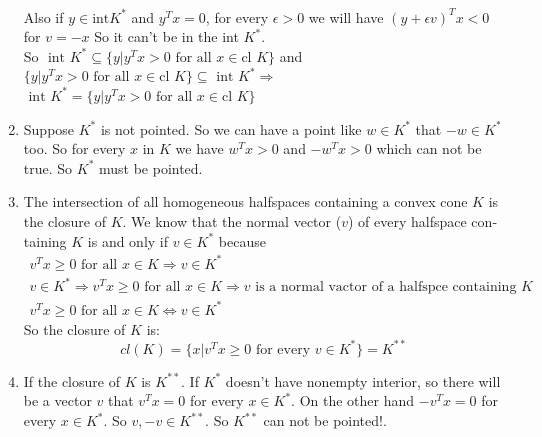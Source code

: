 \documentclass[a4paper]{article}
\begin{document}
\begin{latin}
\begin{enumerate}
	\\
	Also if $ y \in \text{int} K^{*} $ and $ y^{T}x = 0 $, for every $ \epsilon >0 $
	we will have $ (y+\epsilon v)^{T}x < 0 $ for $ v = -x $ So it can't be in the int $ K^{*} $. 
	\\
	So $ \text{ int } K^{*} \subseteq \{y | y^{T} x > 0 \text{ for all } x \in \text{cl } K \}$ and $ \{y | y^{T} x > 0 \text{ for all } x \in \text{cl } K \} \subseteq \text{ int } K^{*} \Rightarrow $ $ \text{ int } K^{*} = \{y | y^{T} x > 0 \text{ for all } x \in \text{cl } K \}$
	\item 
	Suppose $ K^{*} $ is not pointed. So we can have a point like $ w \in K^{*} $ that $ -w \in K^{*} $ too. So for every $ x $ in $ K $ we have $ w^{T}x>0 $ and $ -w^{T}x>0 $ which can not be true. So $ K^{*} $ must be pointed.
	\item
	The intersection of all homogeneous halfspaces containing a convex cone $ K $ is the closure of $ K $.
	We know that the normal vector ($ v $) of every halfspace containing $ K $ is and only if $ v \in K^{*} $ because 
	\begin{gather*}
		v^{T}x \geq 0 \text{ for all } x \in K \Rightarrow v \in K^{*}
		\\
		v \in K^{*} \Rightarrow  v^{T}x \geq 0 \text{ for all } x \in K \Rightarrow v \text{ is a normal vactor of a halfspce containing } K
		\\
		v^{T}x \geq 0 \text{ for all } x \in K \Leftrightarrow v \in K^{*}
	\end{gather*}
	So the closure of $ K $ is:
	\begin{equation*}
		cl(K) = \{x | v^{T} x \geq 0 \text{ for every } v \in K^{*}\} = K^{**}
	\end{equation*}
	\item 
	If the closure of $ K $ is $ K^{**} $. If  $ K^{*} $ doesn't have nonempty interior, so there will be a vector $ v $ that $ v^{T}x = 0 $ for every $ x \in  K^{*} $. On the other hand $ -v^{T}x = 0 $ for every $ x \in  K^{*} $. So $ v, -v \in K^{**} $. So $ K^{**} $ can not be pointed!.
\end{enumerate}

\end{latin}
\end{document}
